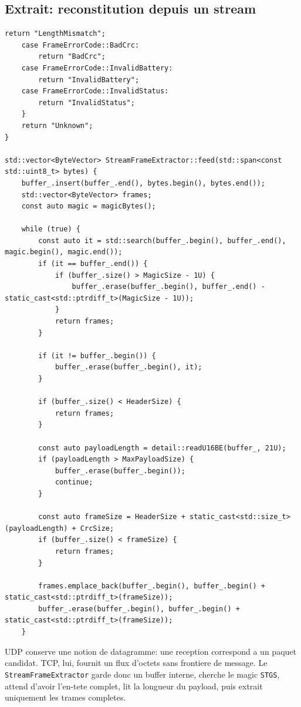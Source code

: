 \documentclass[10pt,a4paper]{article}
\begin{document}
\subsection{Extrait: reconstitution depuis un stream}
\begin{lstlisting}[caption={Extraction de trames completes depuis un flux TCP}]
        return "LengthMismatch";
    case FrameErrorCode::BadCrc:
        return "BadCrc";
    case FrameErrorCode::InvalidBattery:
        return "InvalidBattery";
    case FrameErrorCode::InvalidStatus:
        return "InvalidStatus";
    }
    return "Unknown";
}

std::vector<ByteVector> StreamFrameExtractor::feed(std::span<const std::uint8_t> bytes) {
    buffer_.insert(buffer_.end(), bytes.begin(), bytes.end());
    std::vector<ByteVector> frames;
    const auto magic = magicBytes();

    while (true) {
        const auto it = std::search(buffer_.begin(), buffer_.end(), magic.begin(), magic.end());
        if (it == buffer_.end()) {
            if (buffer_.size() > MagicSize - 1U) {
                buffer_.erase(buffer_.begin(), buffer_.end() - static_cast<std::ptrdiff_t>(MagicSize - 1U));
            }
            return frames;
        }

        if (it != buffer_.begin()) {
            buffer_.erase(buffer_.begin(), it);
        }

        if (buffer_.size() < HeaderSize) {
            return frames;
        }

        const auto payloadLength = detail::readU16BE(buffer_, 21U);
        if (payloadLength > MaxPayloadSize) {
            buffer_.erase(buffer_.begin());
            continue;
        }

        const auto frameSize = HeaderSize + static_cast<std::size_t>(payloadLength) + CrcSize;
        if (buffer_.size() < frameSize) {
            return frames;
        }

        frames.emplace_back(buffer_.begin(), buffer_.begin() + static_cast<std::ptrdiff_t>(frameSize));
        buffer_.erase(buffer_.begin(), buffer_.begin() + static_cast<std::ptrdiff_t>(frameSize));
    }
\end{lstlisting}


UDP conserve une notion de datagramme: une reception correspond a un paquet candidat. TCP, lui, fournit un flux d'octets sans frontiere de message. Le \texttt{StreamFrameExtractor} garde donc un buffer interne, cherche le magic \texttt{STGS}, attend d'avoir l'en-tete complet, lit la longueur du payload, puis extrait uniquement les trames completes.
\end{document}
